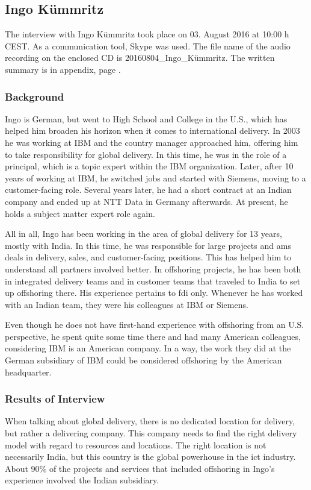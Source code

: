 \subsection{Ingo K\"ummritz}
The interview with Ingo K\"ummritz took place on 03. August 2016 at 10:00 h CEST. As a communication tool, Skype was used. The file name of the audio recording on the enclosed CD is 20160804\_Ingo\_K\"ummritz. The written summary is in appendix, page \pageref{int:Ingo}.

\subsubsection{Background}
Ingo is German, but went to High School and College in the U.S., which has helped him broaden his horizon when it comes to international delivery. In 2003 he was working at IBM and the country manager approached him, offering him to take responsibility for global delivery. In this time, he was in the role of a principal, which is a topic expert within the IBM organization. Later, after 10 years of working at IBM, he switched jobs and started with Siemens, moving to a customer-facing role. Several years later, he had a short contract at an Indian company and ended up at NTT Data in Germany afterwards. At present, he holds a subject matter expert role again.

All in all, Ingo has been working in the area of global delivery for 13 years, mostly with India. In this time, he was responsible for large projects and \gls{ams} deals in delivery, sales, and customer-facing positions. This has helped him to understand all partners involved better. In offshoring projects, he has been both in integrated delivery teams and in customer teams that traveled to India to set up offshoring there. His experience pertains to \gls{fdi} only. Whenever he has worked with an Indian team, they were his colleagues at IBM or Siemens.

Even though he does not have first-hand experience with offshoring from an U.S. perspective, he spent quite some time there and had many American colleagues, considering IBM is an American company. In a way, the work they did at the German subsidiary of IBM could be considered offshoring by the American headquarter.

\subsubsection{Results of Interview}
When talking about global delivery, there is no dedicated location for delivery, but rather a delivering company. This company needs to find the right delivery model with regard to resources and locations. The right location is not necessarily India, but this country is the global powerhouse in the \gls{ict} industry. About 90\% of the projects and services that included offshoring in Ingo's experience involved the Indian subsidiary.

